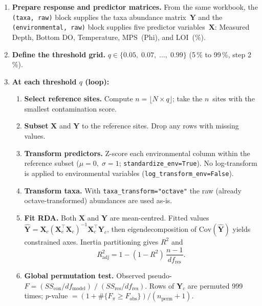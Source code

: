 \documentclass[11pt]{article}
\begin{document}
\begin{enumerate}[leftmargin=*]
  \item \textbf{Prepare response and predictor matrices.}
    From the same workbook, the \texttt{(taxa, raw)} block supplies the
    taxa abundance matrix~$\mathbf{Y}$ and the
    \texttt{(environmental, raw)} block supplies five predictor
    variables~$\mathbf{X}$:
    Measured Depth, Bottom DO, Temperature, MPS~(Phi), and LOI~(\%).

  \item \textbf{Define the threshold grid.}
    $q \in \{0.05,\;0.07,\;\ldots,\;0.99\}$
    (5\,\% to 99\,\%, step 2\,\%).

  \item \textbf{At each threshold $q$ (loop):}
    \begin{enumerate}[label=(\alph*)]
      \item \textbf{Select reference sites.}
        Compute $n = \lfloor N \times q \rfloor$; take the $n$~sites
        with the smallest contamination score.

      \item \textbf{Subset} $\mathbf{X}$ and $\mathbf{Y}$ to the
        reference sites.  Drop any rows with missing values.

      \item \textbf{Transform predictors.}
        Z-score each environmental column within the reference subset
        ($\mu=0,\;\sigma=1$; \texttt{standardize\_env=True}).
        No log-transform is applied to environmental variables
        (\texttt{log\_transform\_env=False}).

      \item \textbf{Transform taxa.}
        With \texttt{taxa\_transform="octave"} the raw
        (already octave-transformed) abundances are used as-is.

      \item \textbf{Fit RDA.}
        Both $\mathbf{X}$ and $\mathbf{Y}$ are mean-centred.
        Fitted values $\hat{\mathbf{Y}} = \mathbf{X}_c
        (\mathbf{X}_c^\top \mathbf{X}_c)^{-1}
        \mathbf{X}_c^\top \mathbf{Y}_c$, then eigendecomposition of
        $\mathrm{Cov}(\hat{\mathbf{Y}})$ yields constrained axes.
        Inertia partitioning gives $R^2$ and
        \[
          R^2_{\mathrm{adj}} = 1 - (1-R^2)\,\frac{n-1}{df_{\mathrm{res}}}.
        \]

      \item \textbf{Global permutation test.}
        Observed pseudo-$F = (SS_{\mathrm{con}}/df_{\mathrm{model}})
        \;/\;(SS_{\mathrm{res}}/df_{\mathrm{res}})$.
        Rows of $\mathbf{Y}_c$ are permuted 999 times; $p$-value
        $= (1 + \#\{F_{\pi} \ge F_{\mathrm{obs}}\})
           /(n_{\mathrm{perm}}+1)$.


\end{enumerate}
\end{enumerate}
\end{document}
